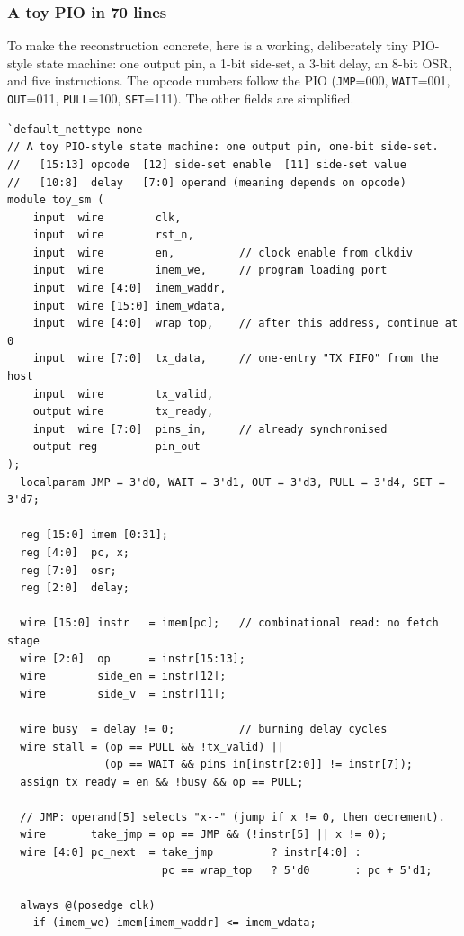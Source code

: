 \subsubsection{A toy PIO in 70 lines}\label{sec:toy}

To make the reconstruction concrete, here is a working, deliberately tiny
PIO-style state machine: one output pin, a 1-bit side-set, a 3-bit delay, an
8-bit OSR, and five instructions. The opcode numbers follow the PIO
(\texttt{JMP}=000, \texttt{WAIT}=001, \texttt{OUT}=011, \texttt{PULL}=100,
\texttt{SET}=111). The other fields are simplified.
{\small
\begin{verbatim}
`default_nettype none
// A toy PIO-style state machine: one output pin, one-bit side-set.
//   [15:13] opcode  [12] side-set enable  [11] side-set value
//   [10:8]  delay   [7:0] operand (meaning depends on opcode)
module toy_sm (
    input  wire        clk,
    input  wire        rst_n,
    input  wire        en,          // clock enable from clkdiv
    input  wire        imem_we,     // program loading port
    input  wire [4:0]  imem_waddr,
    input  wire [15:0] imem_wdata,
    input  wire [4:0]  wrap_top,    // after this address, continue at 0
    input  wire [7:0]  tx_data,     // one-entry "TX FIFO" from the host
    input  wire        tx_valid,
    output wire        tx_ready,
    input  wire [7:0]  pins_in,     // already synchronised
    output reg         pin_out
);
  localparam JMP = 3'd0, WAIT = 3'd1, OUT = 3'd3, PULL = 3'd4, SET = 3'd7;

  reg [15:0] imem [0:31];
  reg [4:0]  pc, x;
  reg [7:0]  osr;
  reg [2:0]  delay;

  wire [15:0] instr   = imem[pc];   // combinational read: no fetch stage
  wire [2:0]  op      = instr[15:13];
  wire        side_en = instr[12];
  wire        side_v  = instr[11];

  wire busy  = delay != 0;          // burning delay cycles
  wire stall = (op == PULL && !tx_valid) ||
               (op == WAIT && pins_in[instr[2:0]] != instr[7]);
  assign tx_ready = en && !busy && op == PULL;

  // JMP: operand[5] selects "x--" (jump if x != 0, then decrement).
  wire       take_jmp = op == JMP && (!instr[5] || x != 0);
  wire [4:0] pc_next  = take_jmp         ? instr[4:0] :
                        pc == wrap_top   ? 5'd0       : pc + 5'd1;

  always @(posedge clk)
    if (imem_we) imem[imem_waddr] <= imem_wdata;


\end{verbatim}}
